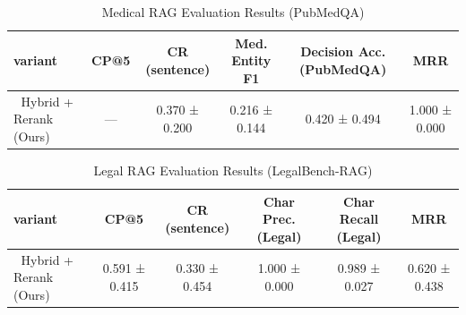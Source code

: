 \begin{table}[ht]
\centering
\small
\begin{tabular}{lccccc}
\toprule
\textbf{variant} & \textbf{CP@5} & \textbf{CR (sentence)} & \textbf{Med. Entity F1} & \textbf{Decision Acc. (PubMedQA)} & \textbf{MRR} \\
\midrule
🔀 Hybrid + Rerank (Ours) & — & 0.370 ± 0.200 & 0.216 ± 0.144 & 0.420 ± 0.494 & 1.000 ± 0.000 \\
\bottomrule
\end{tabular}
\caption{Medical RAG Evaluation Results (PubMedQA)}
\label{{tab:rag_eval}}
\end{table}

\begin{table}[ht]
\centering
\small
\begin{tabular}{lccccc}
\toprule
\textbf{variant} & \textbf{CP@5} & \textbf{CR (sentence)} & \textbf{Char Prec. (Legal)} & \textbf{Char Recall (Legal)} & \textbf{MRR} \\
\midrule
🔀 Hybrid + Rerank (Ours) & 0.591 ± 0.415 & 0.330 ± 0.454 & 1.000 ± 0.000 & 0.989 ± 0.027 & 0.620 ± 0.438 \\
\bottomrule
\end{tabular}
\caption{Legal RAG Evaluation Results (LegalBench-RAG)}
\label{{tab:rag_eval}}
\end{table}